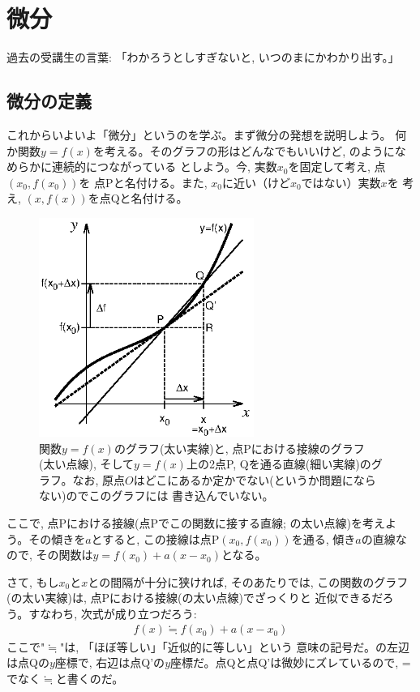 \chapter{微分}

{\small 過去の受講生の言葉: 「わかろうとしすぎないと, いつのまにかわかり出す。」}

\section{微分の定義}\label{sect_def_differential}

これからいよいよ「微分」というのを学ぶ。まず微分の発想を説明しよう。
何か関数$y=f(x)$を考える。そのグラフの形はどんなでもいいけど, 
のようになめらかに連続的につながっている
としよう。今, 実数$x_0$を固定して考え, 点$(x_0, f(x_0))$を
点Pと名付ける。また, $x_0$に近い（けど$x_0$ではない）実数$x$を
考え, $(x, f(x))$を点Qと名付ける。

\begin{figure}[h]
    \centering
    \includegraphics[width=7cm]{diff_explain.eps}
    \caption{関数$y=f(x)$のグラフ(太い実線)と, 点Pにおける接線のグラフ
(太い点線), そして$y=f(x)$上の2点P, Qを通る直線(細い実線)のグラフ。なお, 
原点$O$はどこにあるか定かでない(というか問題にならない)のでこのグラフには
書き込んでいない。}
\label{fig:diff_explain}\end{figure}

ここで, 点Pにおける接線(点Pでこの関数に接する直線; 
の太い点線)を考えよう。その傾きを$a$とすると, 
この接線は点P$(x_0, f(x_0))$を通る, 傾き$a$の直線なので, 
その関数は$y=f(x_0)+a(x-x_0)$となる。

さて, もし$x_0$と$x$との間隔が十分に狭ければ, そのあたりでは, 
この関数のグラフ(の太い実線)は, 
点Pにおける接線(の太い点線)でざっくりと
近似できるだろう。すなわち, 次式が成り立つだろう:
\begin{eqnarray}
f(x) \fallingdotseq f(x_0)+a(x-x_0)\label{eq:define_dif0}
\end{eqnarray}
ここで"$\fallingdotseq$"は, 「ほぼ等しい」「近似的に等しい」という
意味の記号だ。の左辺は点Qの$y$座標で, 
右辺は点Q'の$y$座標だ。点Qと点Q'は微妙にズレているので, 
=でなく$\fallingdotseq$と書くのだ。

